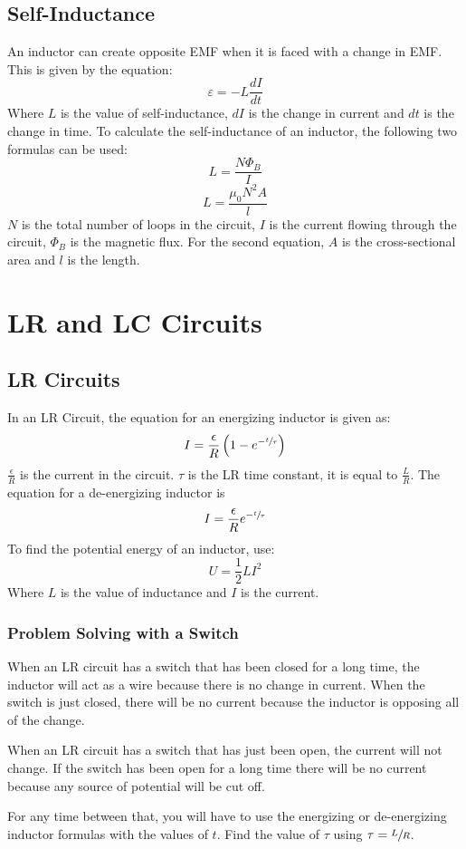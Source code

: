 \documentclass{article}
\begin{document}
\subsection{Self-Inductance}
An inductor can create opposite EMF when it is faced with a change in EMF.  This is given by the equation:
\[ \varepsilon = -L\frac{dI}{dt} \]
Where $L$ is the value of self-inductance, $dI$ is the change in current and $dt$ is the change in time.  To calculate the self-inductance of an inductor, the following two formulas can be used:
\[ L = \frac{N\Phi_B}{I} \]
\[ L = \frac{\mu_0N^2A}{l} \]
$N$ is the total number of loops in the circuit, $I$ is the current flowing through the circuit, $\Phi_B$ is the magnetic flux.
For the second equation, $A$ is the cross-sectional area and $l$ is the length.
\section{LR and LC Circuits}
\subsection{LR Circuits}
In an LR Circuit, the equation for an energizing inductor is given as:
\[ I = \frac{\epsilon}{R}\left( 1 - e^{-\sfrac{t}{\tau}} \right)\]
$\frac{\epsilon}{R}$ is the current in the circuit. $\tau$ is the LR time constant, it is equal to $\frac{L}{R}$.
The equation for a de-energizing inductor is
\[ I = \frac{\epsilon}{R}e^{-\sfrac{t}{\tau}} \]
To find the potential energy of an inductor, use:
\[ U = \frac{1}{2} LI^2 \]
Where $L$ is the value of inductance and $I$ is the current.
\subsubsection{Problem Solving with a Switch}
When an LR circuit has a switch that has been closed for a long time, the inductor will act as a wire because there is no change in current.  When the switch is just closed, there will be no current because the inductor is opposing all of the change.

When an LR circuit has a switch that has just been open, the current will not change.  If the switch has been open for a long time there will be no current because any source of potential will be cut off.

For any time between that, you will have to use the energizing or de-energizing inductor formulas with the values of $t$.  Find the value of $\tau$ using $\tau=\sfrac{L}{R}$.
\end{document}
